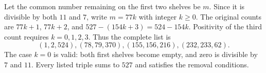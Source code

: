 Let the common number remaining on the first two shelves be $m$. Since it is divisible by both $11$ and $7$, write $m=77k$ with integer $k\ge0$. The original counts are $77k+1$, $77k+2$, and $527-(154k+3)=524-154k$. Positivity of the third count requires $k=0,1,2,3$. Thus the complete list is
\[\boxed{(1,2,524),(78,79,370),(155,156,216),(232,233,62)}.\]
The case $k=0$ is valid: both first shelves become empty, and zero is divisible by $7$ and $11$. Every listed triple sums to $527$ and satisfies the removal conditions.
